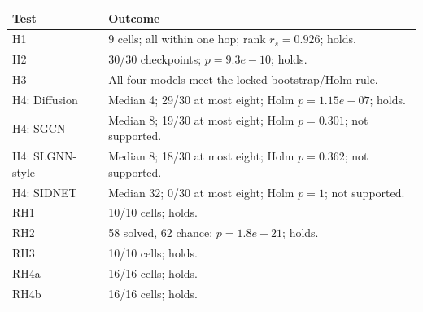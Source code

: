 \begin{tabular}{@{}lp{}@{}}
\toprule
Test & Outcome \\
\midrule
H1 & 9 cells; all within one hop; rank $r_s=0.926$; holds. \\
H2 & 30/30 checkpoints; $p=9.3e-10$; holds. \\
H3 & All four models meet the locked bootstrap/Holm rule. \\
H4: Diffusion & Median 4; 29/30 at most eight; Holm $p=1.15e-07$; holds. \\
H4: SGCN & Median 8; 19/30 at most eight; Holm $p=0.301$; not supported. \\
H4: SLGNN-style & Median 8; 18/30 at most eight; Holm $p=0.362$; not supported. \\
H4: SIDNET & Median 32; 0/30 at most eight; Holm $p=1$; not supported. \\
RH1 & 10/10 cells; holds. \\
RH2 & 58 solved, 62 chance; $p=1.8e-21$; holds. \\
RH3 & 10/10 cells; holds. \\
RH4a & 16/16 cells; holds. \\
RH4b & 16/16 cells; holds. \\
\bottomrule
\end{tabular}
